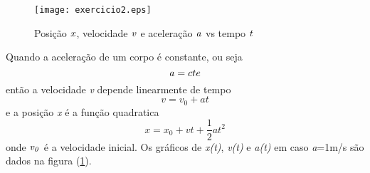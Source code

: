 \documentclass{article}
\begin{document}
\begin{figure}[h]
\texttt{[image: exercicio2.eps]}
\caption{Posi{\c c}{\~ a}o ${\it x}$, velocidade ${\it v}$ e
acelera{\c c}{\~ a}o ${\it a}$ vs tempo ${\it t}$}
\label{fig1}
\end{figure}

Quando a acelera{\c c}{\~ a}o de um corpo {\' e} constante, ou seja
\begin{equation}
{\it a}=cte
\label{eq1}
\end{equation}
ent{\~ a}o a velocidade {\it v} depende linearmente de tempo
\begin{equation}
v=v_0+at
\label{eq2}
\end{equation}
e a posi{\c c}{\~ a}o {\it x} {\' e} a fun{\c c}{\~ a}o quadratica
\begin{equation}
x=x_0+vt+\frac{1}{2}at^2
\label{eq3}
\end{equation}
onde ${\it v_0}$ {\' e} a velocidade inicial. Os gr{\' a}ficos de {\it x(t)},
{\it v(t)} e {\it a(t)} em caso {\it a}=1m/s s{\~ a}o dados na figura
(\ref{fig1}).
\end{document}
